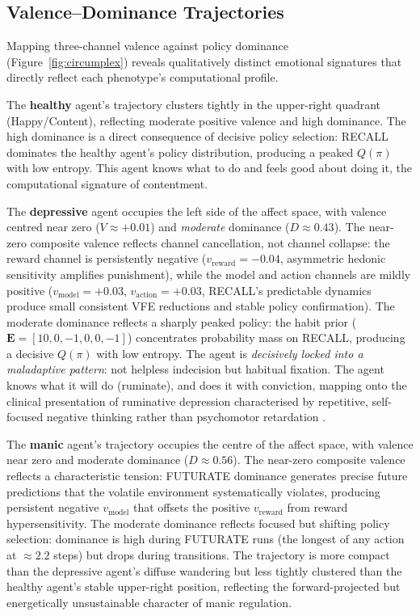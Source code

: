\documentclass[11pt,a4paper]{article}
\begin{document}
\subsection{Valence--Dominance Trajectories}

Mapping three-channel valence against policy dominance (Figure~\ref{fig:circumplex}) reveals qualitatively distinct emotional signatures that directly reflect each phenotype's computational profile.

The \textbf{healthy} agent's trajectory clusters tightly in the upper-right quadrant (Happy/Content), reflecting moderate positive valence and high dominance. The high dominance is a direct consequence of decisive policy selection: RECALL dominates the healthy agent's policy distribution, producing a peaked $Q(\pi)$ with low entropy. This agent knows what to do and feels good about doing it, the computational signature of contentment.

The \textbf{depressive} agent occupies the left side of the affect space, with valence centred near zero ($V \approx +0.01$) and \emph{moderate} dominance ($D \approx 0.43$). The near-zero composite valence reflects channel cancellation, not channel collapse: the reward channel is persistently negative ($v_{\text{reward}} = -0.04$, asymmetric hedonic sensitivity amplifies punishment), while the model and action channels are mildly positive ($v_{\text{model}} = +0.03$, $v_{\text{action}} = +0.03$, RECALL's predictable dynamics produce small consistent VFE reductions and stable policy confirmation). The moderate dominance reflects a sharply peaked policy: the habit prior ($\mathbf{E} = [10, 0, -1, 0, 0, -1]$) concentrates probability mass on RECALL, producing a decisive $Q(\pi)$ with low entropy. The agent is \emph{decisively locked into a maladaptive pattern}: not helpless indecision but habitual fixation. The agent knows what it will do (ruminate), and does it with conviction, mapping onto the clinical presentation of ruminative depression characterised by repetitive, self-focused negative thinking rather than psychomotor retardation \citep{nolenhoeksema1991responses, houben2015relation}.

The \textbf{manic} agent's trajectory occupies the centre of the affect space, with valence near zero and moderate dominance ($D \approx 0.56$). The near-zero composite valence reflects a characteristic tension: FUTURATE dominance generates precise future predictions that the volatile environment systematically violates, producing persistent negative $v_{\text{model}}$ that offsets the positive $v_{\text{reward}}$ from reward hypersensitivity. The moderate dominance reflects focused but shifting policy selection: dominance is high during FUTURATE runs (the longest of any action at $\approx 2.2$ steps) but drops during transitions. The trajectory is more compact than the depressive agent's diffuse wandering but less tightly clustered than the healthy agent's stable upper-right position, reflecting the forward-projected but energetically unsustainable character of manic regulation.
\end{document}
